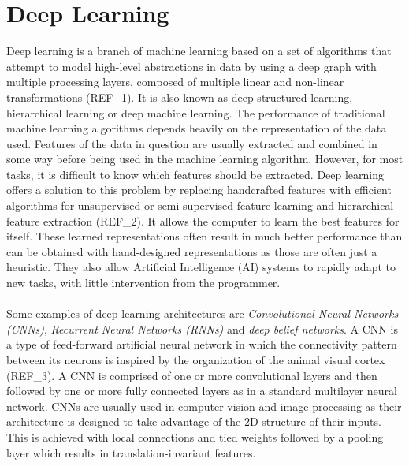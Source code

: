 \section{Deep Learning}
Deep learning is a branch of machine learning based on a set of algorithms that attempt to model high-level abstractions in data by using a deep graph with multiple processing layers, composed of multiple linear and non-linear transformations (REF\_1). It is also known as deep structured learning, hierarchical learning or deep machine learning. The performance of traditional machine learning algorithms depends heavily on the representation of the data used. Features of the data in question are usually extracted and combined in some way before being used in the machine learning algorithm. However, for most tasks, it is difficult to know which features should be extracted. Deep learning offers a solution to this problem by replacing handcrafted features with efficient algorithms for unsupervised or semi-supervised feature learning and hierarchical feature extraction (REF\_2). It allows the computer to learn the best features for itself. These learned representations often result in much better performance than can be obtained with hand-designed representations as those are often just a heuristic. They also allow Artificial Intelligence (AI) systems to rapidly adapt to new tasks, with little intervention from the programmer.\\ \\
%
Some examples of deep learning architectures are \textit{Convolutional Neural Networks (CNNs)}, \textit{Recurrent Neural Networks (RNNs)} and \textit{deep belief networks}. A CNN is a type of feed-forward artificial neural network in which the connectivity pattern between its neurons is inspired by the organization of the animal visual cortex (REF\_3). A CNN is comprised of one or more convolutional layers and then followed by one or more fully connected layers as in a standard multilayer neural network. CNNs are usually used in computer vision and image processing as their architecture is designed to take advantage of the 2D structure of their inputs. This is achieved with local connections and tied weights followed by a pooling layer which results in translation-invariant features.\\ \\ 
%
